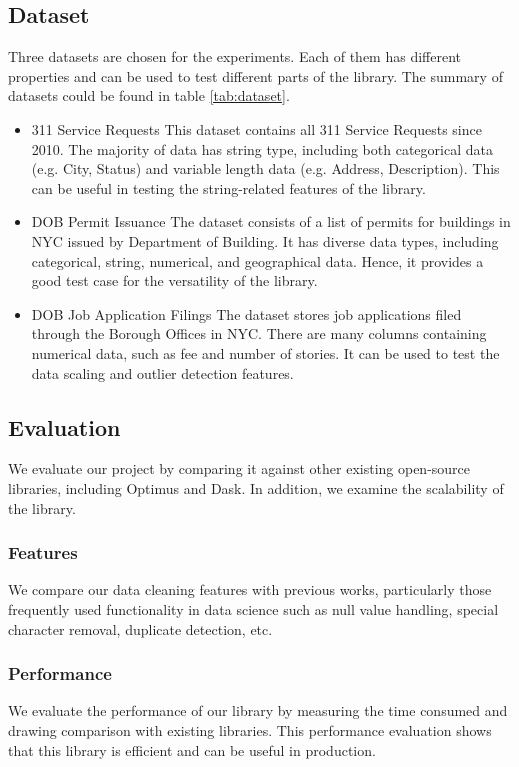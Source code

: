 \documentclass[sigconf]{acmart}
\begin{document}
\subsection{Dataset}
Three datasets are chosen for the experiments. Each of them has different properties and can be used to test different parts of the library. The summary of datasets could be found in table \ref{tab:dataset}.
\begin{itemize}
	\item{311 Service Requests}\cite{nycopendata1} This dataset contains all 311 Service Requests since 2010. The majority of data has string type, including both categorical  data (e.g. City, Status) and variable length data (e.g. Address, Description). This can be useful in testing the string-related features of the library.
	\item{DOB Permit Issuance}\cite{nycopendata2} The dataset consists of a list of permits for buildings in NYC issued by Department of Building. It has diverse data types, including categorical, string, numerical, and geographical data. Hence, it provides a good test case for the versatility of the library. 
	\item{DOB Job Application Filings}\cite{nycopendata3} The dataset stores job applications filed through the Borough Offices in NYC. There are many columns containing numerical data, such as fee and number of stories. It can be used to test the data scaling and outlier detection features. 
\end{itemize}

\subsection{Evaluation}
We evaluate our project by comparing it against other existing open-source libraries, including Optimus\cite{optimus} and Dask\cite{dask}. In addition, we examine the scalability of the library.
\subsubsection{Features}
We compare our data cleaning features with previous works, particularly those frequently used functionality in data science such as null value handling, special character removal, duplicate detection, etc. 
\subsubsection{Performance}
We evaluate the performance of our library by measuring the time consumed and drawing comparison with existing libraries. This performance evaluation shows that this library is efficient and can be useful in production. 
\end{document}
